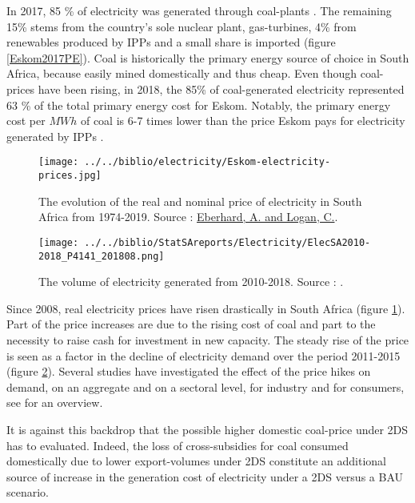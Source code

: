 \documentclass[12pt,english]{article}
\begin{document}
In 2017, 85 \% of electricity was generated through coal-plants \citep{Eskom2017AR}. The remaining 15\% stems from the country's sole nuclear plant, gas-turbines, 4\% from renewables produced by IPPs and a small share is imported (figure \ref{Eskom2017PE}). Coal is historically the primary energy source of choice in South Africa, because easily mined domestically and thus cheap. Even though coal-prices have been rising, in 2018, the 85\% of coal-generated electricity represented 63 \% of the total primary energy cost for Eskom. Notably, the primary energy cost per $MWh$ of coal is 6-7 times lower than the price Eskom pays for electricity generated by IPPs \citep{Eskom2017AR}.  

\begin{figure}[!t]
	\centering
	\texttt{[image: ../../biblio/electricity/Eskom-electricity-prices.jpg]}
	\caption{\label{Eskom-electricity-prices} The evolution of the real and nominal price of electricity in South Africa from 1974-2019. Source : \href{https://mybroadband.co.za/news/business/68724-how-lecturers-tore-eskoms-tariff-case-apart-in-25-minutes.html}{Eberhard, A. and Logan, C.}.}
\end{figure}


\begin{figure}[!t]
	\centering
	\texttt{[image: ../../biblio/StatSAreports/Electricity/ElecSA2010-2018\_P4141\_201808.png]}
	\caption{\label{Elecvolume_2010_2018}The volume of electricity generated from 2010-2018. Source : \citep{P4141_201808}.}
\end{figure}

Since 2008, real electricity prices have risen drastically in South Africa (figure \ref{Eskom-electricity-prices}). Part of the price increases are due to the rising cost of coal and part to the necessity to raise cash for investment in new capacity. The steady rise of the price is seen as a factor in the decline of electricity demand over the period 2011-2015 (figure \ref{Elecvolume_2010_2018}). Several studies have investigated the effect of the price hikes on demand, on an aggregate and on a sectoral level, for industry and for consumers, see \cite{goliger2018electricity} for an overview.


It is against this backdrop that the possible higher domestic coal-price under 2DS has to evaluated. Indeed, the loss of cross-subsidies for coal consumed domestically due to lower export-volumes under 2DS constitute an additional source of increase in the generation cost of electricity under a 2DS versus a BAU scenario.
\end{document}
